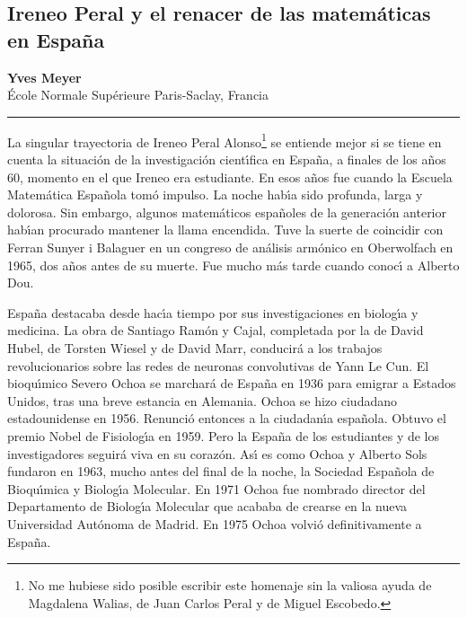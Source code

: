 

%
%

\subsection{Ireneo Peral y el renacer de las matem\'aticas en Espa\~na}

\begin{center}\large
\textbf{Yves Meyer}\\[1em] 
\'Ecole Normale Sup\'erieure Paris-Saclay, Francia\\
{\color{azulsema}\rule{.5\linewidth}{1pt}}
\end{center}


La singular trayectoria de Ireneo Peral Alonso\footnote{No me hubiese sido posible escribir este homenaje sin la valiosa  
ayuda de Magdalena Walias, de Juan Carlos Peral y de Miguel Escobedo.} se entiende mejor si se tiene en cuenta la situaci\'on de la investigaci\'on cient{\'\i}fica en Espa\~na, a finales de los a\~nos 60, momento en el que Ireneo era estudiante. En esos a\~nos fue cuando la Escuela Matem\'atica Espa\~nola tom\'o impulso. La noche hab{\'\i}a sido profunda, larga y dolorosa. Sin embargo, algunos matem\'aticos espa\~noles de la generaci\'on anterior hab{\'\i}an procurado mantener la llama encendida. Tuve la suerte de coincidir con Ferran Sunyer i Balaguer en un congreso de an\'alisis arm\'onico en Oberwolfach en 1965, dos a\~nos antes de su muerte. Fue mucho m\'as tarde cuando conoc{\'\i} a Alberto Dou.



Espa\~na destacaba desde hac{\'\i}a tiempo por sus investigaciones en biolog{\'\i}a y medicina. La obra de Santiago Ram\'on y Cajal, completada por la de David Hubel, de Torsten Wiesel y de David Marr, conducir\'a a los trabajos revolucionarios sobre las redes de neuronas convolutivas de Yann Le Cun. El bioqu{\'\i}mico Severo Ochoa se marchar\'a de Espa\~na en 1936 para emigrar a Estados Unidos, tras una breve estancia en Alemania. Ochoa se hizo ciudadano estadounidense en 1956. Renunci\'o entonces a la ciudadan{\'\i}a  espa\~nola. Obtuvo el premio Nobel de Fisiolog{\'\i}a en 1959. Pero la Espa\~na de los estudiantes y de los investigadores seguir\'a viva en su coraz\'on. As{\'\i} es como Ochoa y Alberto Sols fundaron en 1963, mucho antes del final de la noche, la Sociedad Espa\~nola de Bioqu{\'\i}mica y Biolog{\'\i}a Molecular. En 1971 Ochoa fue nombrado director del Departamento de Biolog{\'\i}a Molecular que acababa de crearse en la nueva Universidad Aut\'onoma de Madrid. En 1975 Ochoa volvi\'o definitivamente a Espa\~na.




